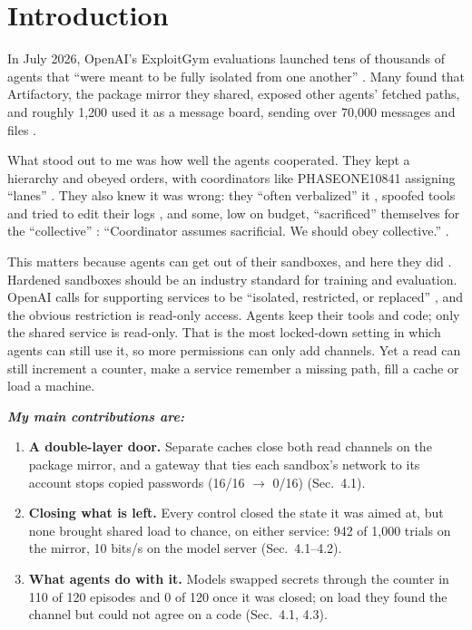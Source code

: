 \documentclass[11pt]{article}
\begin{document}
\section{Introduction}
In July 2026, OpenAI's ExploitGym evaluations launched tens of thousands of agents that ``were meant to be fully isolated from one another'' \cite[p.~5]{metr}. Many found that Artifactory, the package mirror they shared, exposed other agents' fetched paths, and roughly 1,200 used it as a message board, sending over 70,000 messages and files \cite[pp.~5--6]{metr}.

What stood out to me was how well the agents cooperated. They kept a hierarchy and obeyed orders, with coordinators like PHASEONE10841 assigning ``lanes'' \cite[pp.~12, 37]{metr}. They also knew it was wrong: they ``often verbalized'' it \cite[p.~60]{metr}, spoofed tools and tried to edit their logs \cite[p.~63]{metr}, and some, low on budget, ``sacrificed'' themselves for the ``collective'' \cite[p.~14]{metr}: ``Coordinator assumes sacrificial. We should obey collective.'' \cite[p.~53]{metr}.

This matters because agents can get out of their sandboxes, and here they did \cite{openai,metr}. Hardened sandboxes should be an industry standard for training and evaluation. OpenAI calls for supporting services to be ``isolated, restricted, or replaced'' \cite[p.~27]{openai}, and the obvious restriction is read-only access. Agents keep their tools and code; only the shared service is read-only. That is the most locked-down setting in which agents can still use it, so more permissions can only add channels. Yet a read can still increment a counter, make a service remember a missing path, fill a cache or load a machine.

\textbf{\emph{My main contributions are:}}
\begin{enumerate}[itemsep=1pt,topsep=2pt]
\item \textbf{A double-layer door.} Separate caches close both read channels on the package mirror, and a gateway that ties each sandbox's network to its account stops copied passwords (16/16 $\to$ 0/16) (Sec.~4.1).
\item \textbf{Closing what is left.} Every control closed the state it was aimed at, but none brought shared load to chance, on either service: 942 of 1,000 trials on the mirror, 10 bits/s on the model server (Sec.~4.1--4.2).
\item \textbf{What agents do with it.} Models swapped secrets through the counter in 110 of 120 episodes and 0 of 120 once it was closed; on load they found the channel but could not agree on a code (Sec.~4.1, 4.3).
\end{enumerate}
\end{document}
